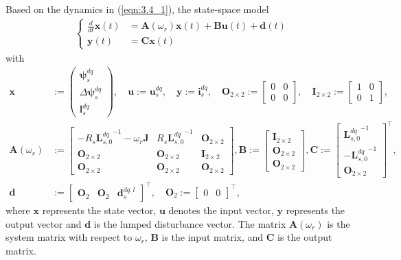 Based on the dynamics in (\ref{eqn:3.4_1}), the state-space model 
\begin{align}\label{eqn:3.5_1}
&\left\{
\begin{aligned}
    \frac{d}{dt}{\mathbf{x}}(t) &= \mathbf{A}(\omega_r)\mathbf{x}(t) + \mathbf{B}\mathbf{u}(t) + \mathbf{d}(t)\\
    \mathbf{y}(t) &= \mathbf{C}\mathbf{x}(t)
\end{aligned}
\right.
\end{align}
with
\begin{equation*}
\begin{aligned}
\mathbf{x} &:= 
\begin{pmatrix}
\boldsymbol{\psi}^{dq}_s \\ \Delta\boldsymbol{\psi}^{dq}_s \\ \mathbf{l}^{dq}_s
\end{pmatrix}, \quad \mathbf{u} := \mathbf{u}^{dq}_s, \quad \mathbf{y} := \mathbf{i}^{dq}_s, \quad \mathbf{O}_{2\times2} := \begin{bmatrix}
0  & 0\\
0 & 0
\end{bmatrix}, \quad \mathbf{I}_{2\times2} := \begin{bmatrix}
1  & 0\\
0 & 1
\end{bmatrix}, \\
\mathbf{A}(\omega_r) &:= 
\begin{bmatrix}
-R_s {\mathbf{L}^{dq}_{s,0}}^{-1} - \omega_r \mathbf{J} & R_s {\mathbf{L}^{dq}_{s,0}}^{-1} & \mathbf{O}_{2\times2} \\
\mathbf{O}_{2\times2} & \mathbf{O}_{2\times2} & \mathbf{I}_{2\times2} \\
\mathbf{O}_{2\times2} & \mathbf{O}_{2\times2} & \mathbf{O}_{2\times2}
\end{bmatrix}, \mathbf{B} := \begin{bmatrix}
\mathbf{I}_{2\times2} \\
\mathbf{O}_{2\times2} \\
\mathbf{O}_{2\times2}
\end{bmatrix}, \mathbf{C} := 
\begin{bmatrix}
{\mathbf{L}^{dq}_{s,0}}^{-1} \\ -{\mathbf{L}^{dq}_{s,0}}^{-1} \\ \mathbf{O}_{2\times2}
\end{bmatrix}^\top, \\
\mathbf{d} &:= \begin{bmatrix}
    \mathbf{O}_2 & \mathbf{O}_2 & \mathbf{d}^{dq,l}_s
\end{bmatrix}^\top, \quad \mathbf{O}_2 := \begin{bmatrix}
    0 & 0
\end{bmatrix}^\top,
\end{aligned}
\end{equation*}
where $\mathbf{x}$ represents the state vector, $\mathbf{u}$ denotes the input vector, $\mathbf{y}$ represents the output vector and $\mathbf{d}$ is the lumped disturbance vector. The matrix $\mathbf{A}(\omega_r)$ is the system matrix with respect to $\omega_r$, $\mathbf{B}$ is the input matrix, and $\mathbf{C}$ is the output matrix. 

